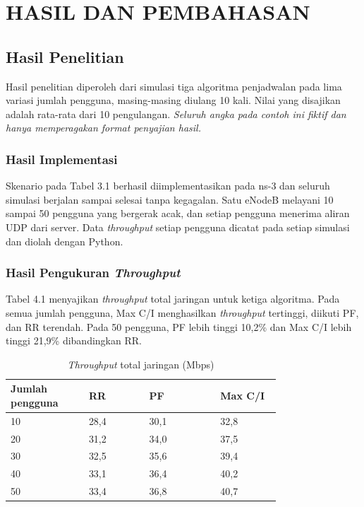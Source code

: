\chapter{HASIL DAN PEMBAHASAN}

\section{Hasil Penelitian}
Hasil penelitian diperoleh dari simulasi tiga algoritma penjadwalan pada lima variasi jumlah pengguna, masing-masing diulang 10 kali. Nilai yang disajikan adalah rata-rata dari 10 pengulangan. \textit{Seluruh angka pada contoh ini fiktif dan hanya memperagakan format penyajian hasil.}

\subsection{Hasil Implementasi}
Skenario pada Tabel 3.1 berhasil diimplementasikan pada ns-3 dan seluruh simulasi berjalan sampai selesai tanpa kegagalan. Satu eNodeB melayani 10 sampai 50 pengguna yang bergerak acak, dan setiap pengguna menerima aliran UDP dari server. Data \textit{throughput} setiap pengguna dicatat pada setiap simulasi dan diolah dengan Python.

\needspace{9cm}
\subsection{Hasil Pengukuran \textit{Throughput}}
Tabel 4.1 menyajikan \textit{throughput} total jaringan untuk ketiga algoritma. Pada semua jumlah pengguna, Max C/I menghasilkan \textit{throughput} tertinggi, diikuti PF, dan RR terendah. Pada 50 pengguna, PF lebih tinggi 10,2\% dan Max C/I lebih tinggi 21,9\% dibandingkan RR.

\begin{singlespace}
\begin{longtable}{|p{0.22\linewidth}|p{0.17\linewidth}|p{0.2\linewidth}|p{0.17\linewidth}|}
\caption{\textit{Throughput} total jaringan (Mbps)}\\
\hline
\textbf{Jumlah pengguna} & \textbf{RR} & \textbf{PF} & \textbf{Max C/I} \\
\hline
10 & 28,4 & 30,1 & 32,8 \\
\hline
20 & 31,2 & 34,0 & 37,5 \\
\hline
30 & 32,5 & 35,6 & 39,4 \\
\hline
40 & 33,1 & 36,4 & 40,2 \\
\hline
50 & 33,4 & 36,8 & 40,7 \\
\hline
\end{longtable}
\end{singlespace}

